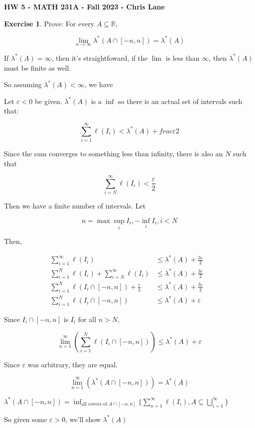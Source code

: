 \documentclass[11pt,oneside]{article}
\numberwithin{equation}{section}
\theoremstyle{definition}
\newtheorem{exercise}{Exercise}
\def\RR{\mathbb{R}}
\begin{document}
\textbf{HW 5 - MATH 231A - Fall 2023 - Chris Lane}

\begin{exercise}
  Prove: For every $A \subseteq \RR$,

  $$
  \lim \limits _{n \to \infty} \lambda ^*(A \cap [-n, n]) = \lambda^*(A)
  $$

  If $\lambda^*(A) = \infty$, then it's straightfoward, if the $\lim$ is less than $\infty$, then $\lambda^*(A)$
  must be finite as well.  

  So assuming $\lambda ^*(A) < \infty$, we have

  Let $ \varepsilon < 0 $ be given.  $\lambda ^*(A)$ is a $\inf$ so there is an
  actual set of intervals such that:

  $$
  \sum \limits _ {i = 1} ^{\infty} \ell(I_i) < \lambda^*(A) + frac{\varepsilon}{2}
  $$

  Since the sum converges to something less than infinity, there is also an $N$ such that
  
  $$
  \sum \limits_{i=N}^{\infty} \ell(I_i) < \frac{\varepsilon}{2} 
  $$

  Then we have a finite number of intervals.  Let

  $$
  n = \max{\sup_i  {I_i}, - \inf_i {I_i}, i < N}
  $$

  Then,

  \begin{align*}
    \sum \limits _{i = 1}^{\infty} \ell(I_i) & \leq \lambda^*(A) + \frac{3 \varepsilon}{2} & \\
    \sum \limits _{i = 1}^N \ell(I_i) + \sum \limits _ {i = N}^\infty \ell(I_i) & \leq \lambda^*(A) + \frac{3 \varepsilon}{2} & \\
    \sum \limits _{i=1}^N \ell(I_i \cap [-n, n] ) + \frac{\varepsilon}{3} & \leq \lambda^*(A) + \frac{3 \varepsilon}{2} & \\
    \sum \limits _{i=1}^N \ell(I_i \cap [-n, n] ) & \leq \lambda^*(A) + \varepsilon
  \end{align*}

    Since $I_i \cap [-n, n]$ is $I_i$ for all $n > N$,
    
    $$
    \lim \limits_{n=1}^{\infty} ( \sum \limits _{i=1}^N \ell(I_i \cap [-n, n] ) )  \leq \lambda^*(A) + \varepsilon 
    $$

    Since $\varepsilon$ was arbitrary, they are equal.

    $$
    \lim \limits_{n=1}^{\infty} ( \lambda ^*( A  \cap [-n, n] ) )  = \lambda^*(A)
    $$
  
  
  
\end{exercise}
\begin{solution}
  $ \lambda ^*(A \cap [-n, n]) = \inf _ {\textrm{all covers of $A \cap [-n, n]$}} \{ \sum \limits _ {n=1}^\infty \ell(I_i), A \subseteq \bigcup \limits _{i=1} ^ {\infty} \} $

  So given some $\varepsilon > 0$, we'll show $\lambda ^* (A)$

\end{solution}
\end{document}
